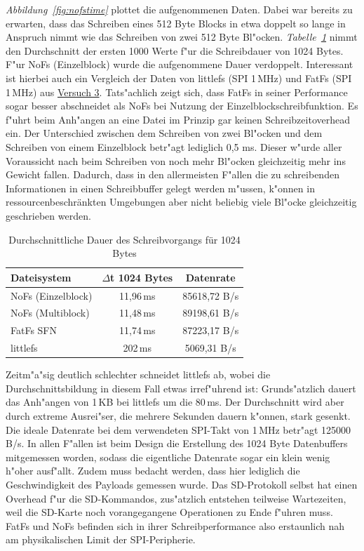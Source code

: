 \documentclass[11pt]{article}
\newcommand*{\tab}[1]{\textit{Tabelle~\ref{#1}}}
\newcommand*{\fig}[1]{\textit{Abbildung~\ref{#1}}}
\begin{document}
\fig{fig:nofstime} plottet die aufgenommenen Daten. Dabei war bereits zu erwarten, dass das Schreiben
eines 512 Byte Blocks in etwa doppelt so lange in Anspruch nimmt wie das Schreiben von zwei 512 Byte
Bl"ocken.
\tab{tab:schreibdauer} nimmt den Durchschnitt der ersten 1000 Werte f"ur die Schreibdauer
von 1024 Bytes. F"ur NoFs (Einzelblock) wurde die aufgenommene Dauer verdoppelt.
Interessant ist hierbei auch ein Vergleich der Daten von littlefs (SPI 1\,MHz) und FatFs (SPI 1\,MHz) aus \hyperref[sec:v3]{Versuch 3}.
Tats"achlich zeigt sich, dass FatFs in seiner Performance sogar besser abschneidet als 
NoFs bei Nutzung der Einzelblockschreibfunktion. Es f"uhrt beim Anh"angen an eine Datei
im Prinzip gar keinen Schreibzeitoverhead ein. Der Unterschied zwischen dem Schreiben
von zwei Bl"ocken und dem Schreiben von einem Einzelblock betr"agt lediglich 0,5 ms.
Dieser w"urde aller Voraussicht nach beim Schreiben von noch mehr Bl"ocken gleichzeitig
mehr ins Gewicht fallen. Dadurch, dass in den allermeisten F"allen die zu schreibenden Informationen
in einen Schreibbuffer gelegt werden m"ussen, k"onnen in ressourcenbeschränkten Umgebungen
aber nicht beliebig viele Bl"ocke gleichzeitig geschrieben werden. \\
\begin{table}[H]
    \centering
    \caption{Durchschnittliche Dauer des Schreibvorgangs für 1024 Bytes}
    \label{tab:schreibdauer}
    \begin{tabular}{lcc}
        \hline
        \textbf{Dateisystem} & \textbf{$\Delta$t 1024 Bytes} & Datenrate  \\
        \hline
        NoFs (Einzelblock)  & 11,96\,ms & 85618,72 B/s\\
        NoFs (Multiblock)  & 11,48\,ms & 89198,61 B/s\\
        FatFs SFN           & 11,74\,ms & 87223,17 B/s\\
        littlefs            & 202\,ms & 5069,31 B/s\\
        \hline
    \end{tabular}
\end{table}
Zeitm"a"sig deutlich schlechter schneidet littlefs ab, wobei die Durchschnittsbildung in diesem Fall etwas irref"uhrend ist:
Grunds"atzlich dauert das Anh"angen von 1\,KB bei littlefs um die 80\,ms. Der Durchschnitt wird
aber durch extreme Ausrei"ser, die mehrere Sekunden dauern k"onnen, stark gesenkt. \\
Die ideale Datenrate bei dem verwendeten SPI-Takt von 1\,MHz betr"agt 125000\,B/s. In allen F"allen ist beim Design
die Erstellung des 1024 Byte Datenbuffers mitgemessen worden, sodass die eigentliche Datenrate sogar ein
klein wenig h"oher ausf"allt. Zudem muss bedacht werden, dass hier lediglich die Geschwindigkeit des Payloads gemessen
wurde. Das SD-Protokoll selbst hat einen Overhead f"ur die SD-Kommandos, zus"atzlich entstehen teilweise 
Wartezeiten, weil die SD-Karte noch vorangegangene Operationen zu Ende f"uhren muss. \\ 
FatFs und NoFs befinden sich in ihrer Schreibperformance also erstaunlich nah 
am physikalischen Limit der SPI-Peripherie. 
\end{document}
